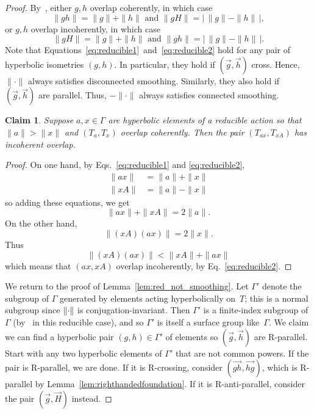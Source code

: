 \documentclass[11pt]{amsart}
\newcommand{\ora}[1]{\overrightarrow{#1}}
\numberwithin{equation}{section}
\numberwithin{figure}{section}
\newtheorem{claim}[theorem]{Claim}
\theoremstyle{definition}
\theoremstyle{plain}
\DeclarePairedDelimiter\norm{\lVert}{\rVert}
\begin{document}
\begin{proof}
By~\cite[Proposition~1.6~(3)]{Pa89:Paulin1989TheGT}, either $g,h$ overlap coherently, in which case
\begin{equation}
\|gh \|=\| g \| + \| h \| \mbox{ and } \|gH \| = |\,\|g \|- \| h \|\, |,
\label{eq:reducible1}
\end{equation}
or $g,h$ overlap incoherently, in which case
\begin{equation}
\|gH \| =\| g\| + \| h \| \mbox{ and } \| gh \| = |\, \| g \| - \| h \|\,|.
\label{eq:reducible2}
\end{equation}
Note that Equations~\eqref{eq:reducible1}~and~\eqref{eq:reducible2} hold for any pair of hyperbolic isometries $(g,h)$. In particular, they hold if $(\ora{g},\ora{h})$ cross.
Hence, $\| \cdot \|$ always satisfies disconnected smoothing. Similarly, they also hold if $(\ora{g},\ora{h})$ are parallel. Thus, $-\| \cdot \|$ always satisfies connected smoothing.

\begin{claim} Suppose $a,x \in \Gamma$ are hyperbolic elements of a
  reducible action so that $\| a \|>\| x \|$ and $(T_a,T_x)$ overlap
  coherently. Then the pair $(T_{ax},T_{xA})$ has incoherent overlap.
\end{claim}
\begin{proof}
On one hand, by Eqs.~\eqref{eq:reducible1} and \eqref{eq:reducible2},
\begin{align*}
\|ax\|&=\|a\|+\|x\| \\
\|xA\| &= \|a\|-\|x\|
\end{align*}
so adding these equations, we get
\[
\|ax\| + \|xA\| = 2\|a\|.
\]
On the other hand,
\[
\|(xA)(ax)\| = 2\|x\|.
\]
Thus
\[
\|(xA)(ax)\| <  \|xA\| + \| ax\|
\]
which means that $(ax,xA)$ overlap incoherently, by Eq.~\eqref{eq:reducible2}.
\end{proof}
We return to the proof of Lemma~\ref{lem:red_not_smoothing}.
Let $\Gamma'$ denote the subgroup of $\Gamma$ generated by elements
acting hyperbolically on~$T$; this is a normal subgroup since
$\norm{\cdot}$ is conjugation-invariant.
Then $\Gamma'$ is a finite-index subgroup of $\Gamma$
(by~\cite[Lemma~6.11(ii)]{CM87:GroupActions} in this reducible case),
and so $\Gamma'$ is itself a surface group like~$\Gamma$.
We claim we
can
find a hyperbolic pair $(g,h) \in \Gamma'$ of elements so $(\ora{g},\ora{h})$ are
R-parallel. Start with any two hyperbolic elements of $\Gamma'$ that
are not common powers.
If the pair is R-parallel, we are
done. If it is R-crossing, consider $(\ora{gh},\ora{hg})$, which is R-parallel by
Lemma~\ref{lem:righthandedfoundation}. If it is R-anti-parallel,
consider the pair $(\ora{g},\ora{H})$ instead.


\end{proof}
\end{document}
